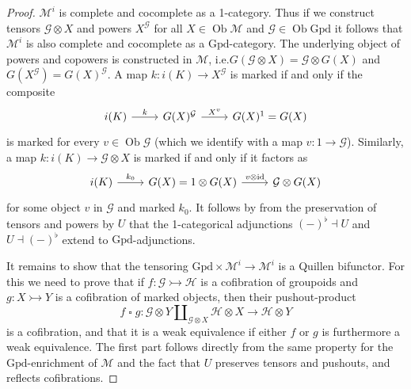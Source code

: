 \documentclass[a4paper]{article}
\theoremstyle{remark}
\theoremstyle{definition}
\begin{document}
\begin{proof}
  $\mathcal{M}^i$ is complete and cocomplete as a 1-category.
  Thus if we construct tensors $\mathcal{G} \otimes X$ and powers $X^\mathcal{G}$ for all $X \in \operatorname{Ob} \mathcal{M}$ and $\mathcal{G} \in \operatorname{Ob} \mathrm{Gpd}$ it follows that $\mathcal{M}^i$ is also complete and cocomplete as a $\mathrm{Gpd}$-category.
  The underlying object of powers and copowers is constructed in $\mathcal{M}$, i.e.\@ $G(\mathcal{G} \otimes X) = \mathcal{G} \otimes G(X)$ and $G(X^\mathcal{G}) = G(X)^\mathcal{G}$.
  A map $k : i(K) \rightarrow X^\mathcal{G}$ is marked if and only if the composite
  \begin{equation}
    \begin{tikzcd}
      i(K) \arrow[r, "k"] & G(X)^\mathcal{G} \arrow[r, "X^v"] & G(X)^1 = G(X)
    \end{tikzcd}
  \end{equation}
  is marked for every $v \in \operatorname{Ob} \mathcal{G}$ (which we identify with a map $v : 1 \rightarrow \mathcal{G}$).
  Similarly, a map $k : i(K) \rightarrow \mathcal{G} \otimes X$ is marked if and only if it factors as
  \begin{equation}
    \begin{tikzcd}
      i(K) \arrow[r, "k_0"] & G(X) = 1 \otimes G(X) \arrow[r, "v \mathbin{\otimes} \mathrm{id}"] & \mathcal{G} \otimes G(X)
    \end{tikzcd}
  \end{equation}
  for some object $v$ in $\mathcal{G}$ and marked $k_0$.
  It follows by \citet[Theorem 4.85]{basic-concepts-of-enriched-category-theory} from the preservation of tensors and powers by $U$ that the 1-categorical adjunctions $(-)^\flat \dashv U$ and $U \dashv (-)^\flat$ extend to $\mathrm{Gpd}$-adjunctions.

  It remains to show that the tensoring $\mathrm{Gpd} \times \mathcal{M}^i \rightarrow \mathcal{M}^i$ is a Quillen bifunctor.
  For this we need to prove that if $f : \mathcal{G} \rightarrowtail \mathcal{H}$ is a cofibration of groupoids and $g : X \rightarrowtail Y$ is a cofibration of marked objects, then their pushout-product
  \begin{equation}
    f \mathbin{\square} g : \mathcal{G} \otimes Y \amalg_{\mathcal{G} \otimes X} \mathcal{H} \otimes X \rightarrow \mathcal{H} \otimes Y
  \end{equation}
  is a cofibration, and that it is a weak equivalence if either $f$ or $g$ is furthermore a weak equivalence.
  The first part follows directly from the same property for the $\mathrm{Gpd}$-enrichment of $\mathcal{M}$ and the fact that $U$ preserves tensors and pushouts, and reflects cofibrations.


\end{proof}
\end{document}
